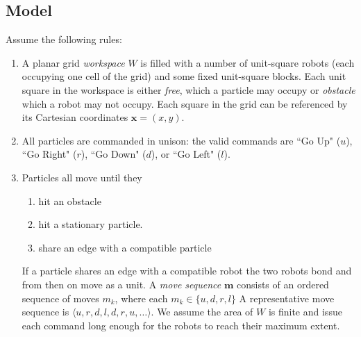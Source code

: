  \subsection{Model}\label{subsec:model}
Assume the following rules:
\begin{enumerate}
\item A planar  grid \emph{workspace} $W$ is filled with a number of unit-square robots (each occupying one cell of the grid)  and some fixed unit-square blocks.  Each unit square in the workspace is either  \emph{free}, which a particle may occupy or \emph{obstacle} which a robot may not occupy.  Each square in the grid can be referenced by its Cartesian coordinates $\bm{x}=(x,y)$.
\item All particles are commanded in unison: the valid commands are  ``Go Up" ($u$), ``Go Right" ($r$), ``Go Down" ($d$), or ``Go Left" ($l$).  
\item Particles all move until they 
	\begin{enumerate}
		\item hit an obstacle 
		\item hit a stationary particle. 
		\item share an edge with a compatible particle
	\end{enumerate}
	If a particle shares an edge with a compatible robot the two robots bond and from then on move as a unit.
A \emph{move sequence} $\bm{m}$ consists of an ordered sequence of moves $m_k$, where each $m_k\in\{u,d,r,l\}$  A representative move sequence is $\langle u,r,d,l,d,r,u,\ldots\rangle$. We assume the area of $W$ is finite and issue each command long enough for the robots to reach their maximum extent.
\end{enumerate}
